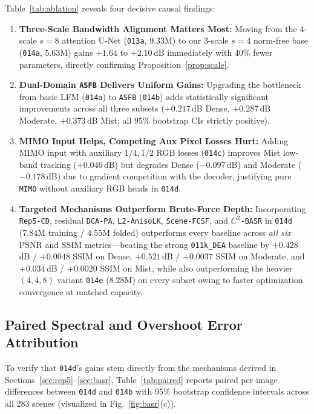 \documentclass[journal,twoside]{IEEEtran}
\begin{document}
Table~\ref{tab:ablation} reveals four decisive causal findings:
\begin{enumerate}
    \item \textbf{Three-Scale Bandwidth Alignment Matters Most:} Moving from the 4-scale $s=8$ attention U-Net (\texttt{013a}, 9.33M) to our 3-scale $s=4$ norm-free base (\texttt{014a}, 5.63M) gains $+1.64$ to $+2.10$\,dB immediately with $40\%$ fewer parameters, directly confirming Proposition~\ref{prop:scale}.
    \item \textbf{Dual-Domain \texttt{ASFB} Delivers Uniform Gains:} Upgrading the bottleneck from basic LFM (\texttt{014a}) to \texttt{ASFB} (\texttt{014b}) adds statistically significant improvements across all three subsets ($+0.217$\,dB Dense, $+0.287$\,dB Moderate, $+0.373$\,dB Mist; all $95\%$ bootstrap CIs strictly positive).
    \item \textbf{MIMO Input Helps, Competing Aux Pixel Losses Hurt:} Adding MIMO input with auxiliary $1/4,1/2$ RGB losses (\texttt{014c}) improves Mist low-band tracking ($+0.046$\,dB) but degrades Dense ($-0.097$\,dB) and Moderate ($-0.178$\,dB) due to gradient competition with the decoder, justifying pure \texttt{MIMO} without auxiliary RGB heads in \texttt{014d}.
    \item \textbf{Targeted Mechanisms Outperform Brute-Force Depth:} Incorporating \texttt{Rep5-CD}, residual \texttt{DCA-PA}, \texttt{L2-AnisoLK}, \texttt{Scene-FCSF}, and \texttt{$C^2$-BASR} in \texttt{014d} (7.84M training / 4.55M folded) outperforms every baseline across \emph{all six} PSNR and SSIM metrics---beating the strong \texttt{011k\_DEA} baseline by $+0.428$\,dB / $+0.0048$ SSIM on Dense, $+0.521$\,dB / $+0.0037$ SSIM on Moderate, and $+0.034$\,dB / $+0.0020$ SSIM on Mist, while also outperforming the heavier $(4,4,8)$ variant \texttt{014e} ($8.28\text{M}$) on every subset owing to faster optimization convergence at matched capacity.
\end{enumerate}

\subsection{Paired Spectral and Overshoot Error Attribution}
\label{sec:paired}

To verify that \texttt{014d}'s gains stem directly from the mechanisms derived in Sections~\ref{sec:rep5}--\ref{sec:basr}, Table~\ref{tab:paired} reports paired per-image differences between \texttt{014d} and \texttt{014b} with $95\%$ bootstrap confidence intervals across all 283 scenes (visualized in Fig.~\ref{fig:basr}(c)).
\end{document}
